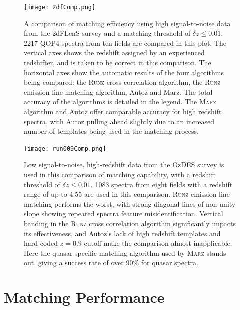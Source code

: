 \documentclass[iop]{emulateapj}
\newcommand{\runz}{\textsc{Runz}}
\newcommand{\thesisname}{\textsc{Marz}}
\begin{document}
\begin{figure}
\centering
\texttt{[image: 2dfComp.png]}
\caption{A comparison of matching efficiency using high signal-to-noise data from the 2dFLenS survey and a matching threshold of $\delta z \leq 0.01$. 2217 QOP4 spectra from ten fields are compared in this plot. The vertical axes shows the redshift assigned by an experienced redshifter, and is taken to be correct in this comparison. The horizontal axes show the automatic results of the four algorithms being compared: the \runz{} cross correlation algorithm, the \runz{} emission line matching algorithm, Autoz and Marz. The total accuracy of the algorithms is detailed in the legend. The \thesisname{} algorithm and Autoz offer comparable accuracy for high redshift spectra, with Autoz pulling ahead slightly due to an increased number of templates being used in the matching process.}
\label{fig:high}
\end{figure}


\begin{figure}
\centering
\texttt{[image: run009Comp.png]}
\caption{Low signal-to-noise, high-redshift data from the OzDES survey is used in this comparison of matching capability, with a redshift threshold of $\delta z \leq 0.01$. 1083 spectra from eight fields with a redshift range of up to 4.55 are used in this comparison. \runz{} emission line matching performs the worst, with strong diagonal lines of non-unity slope showing repeated spectra feature misidentification. Vertical banding in the \runz{} cross correlation algorithm significantly impacts its effectiveness, and Autoz's lack of high redshift templates and hard-coded $z=0.9$ cutoff make the comparison almost inapplicable. Here the quasar specific matching algorithm used by \thesisname{} stands out, giving a success rate of over 90\% for quasar spectra.}
\label{fig:low}
\end{figure}





\section{Matching Performance}
\end{document}
